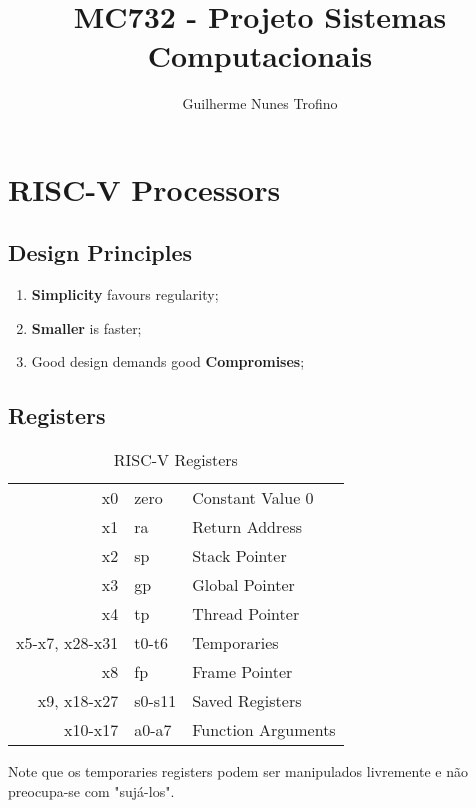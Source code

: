 \documentclass{article}
\title{MC732 - Projeto Sistemas Computacionais}
\author{Guilherme Nunes Trofino}
\begin{document}
    \maketitle
\newpage

    \tableofcontents
\newpage
\section{}


\section{RISC-V Processors}
\subsection{Design Principles}
    \begin{enumerate}
        \item \textbf{Simplicity} favours regularity;
        \item \textbf{Smaller} is faster;
        \item Good design demands good \textbf{Compromises};
    \end{enumerate}

\subsection{Registers}
    \begin{table}[H]
        \centering\begin{tabular}{rl | l}\hline
            x0              & zero  & Constant Value 0\\
            x1              & ra    & Return Address\\
            x2              & sp    & Stack Pointer\\
            x3              & gp    & Global Pointer\\
            x4              & tp    & Thread Pointer\\
            x5-x7, x28-x31  & t0-t6 & Temporaries\\
            x8              & fp    & Frame Pointer\\
            x9,    x18-x27  & s0-s11& Saved Registers\\
            x10-x17         & a0-a7 & Function Arguments\\\hline
        \end{tabular}
        \caption{RISC-V Registers}
        \label{tab:riscvRegisers}
    \end{table}
\noindent Note que os temporaries registers podem ser manipulados livremente e não preocupa-se com "sujá-los".\\
\end{document}
